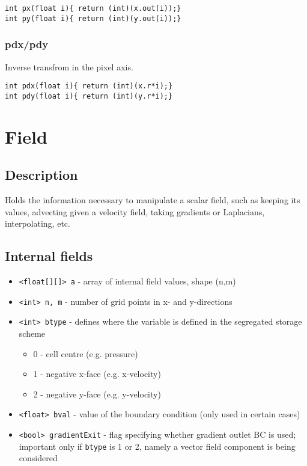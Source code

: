 \documentclass[notitlepage]{article}
\begin{document}
\begin{lstlisting}[style=myCpp]
int px(float i){ return (int)(x.out(i));}
int py(float i){ return (int)(y.out(i));}
\end{lstlisting}

\subsubsection{pdx/pdy}

Inverse transfrom in the pixel axis.

\begin{lstlisting}[style=myCpp]
int pdx(float i){ return (int)(x.r*i);}
int pdy(float i){ return (int)(y.r*i);}
\end{lstlisting}

\section{Field}

\subsection{Description}

Holds the information necessary to manipulate a scalar field,
such as keeping its values, advecting given a velocity field,
taking gradients or Laplacians, interpolating, etc.

\subsection{Internal fields}

\begin{itemize}
\item \texttt{<float[][]> a} - array of internal field values, shape (n,m)
\item \texttt{<int> n, m} - number of grid points in x- and y-directions
\item \texttt{<int> btype} - defines where the variable is defined in the segregated storage scheme
	\begin{itemize}
		\item 0 - cell centre (e.g. pressure)
		\item 1 - negative x-face (e.g. x-velocity)
		\item 2 - negative y-face (e.g. y-velocity)
	\end{itemize}
\item \texttt{<float> bval} - value of the boundary condition (only used in certain cases)
\item \texttt{<bool> gradientExit} - flag specifying whether gradient outlet BC is used;
	important only if \texttt{btype} is 1 or 2, namely a vector field component is being considered
\end{itemize}
\end{document}
